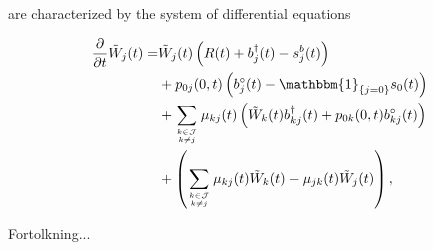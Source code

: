 \documentclass{book}
\newcommand{\1}[1]{\mathbbm{1}_{\left\lbrace #1 \right\rbrace}}
\theoremstyle{break}
\theoremstyle{remark}
\numberwithin{equation}{section}
\begin{document}
are characterized by the system of differential equations

\begin{align*}
    \frac{\partial}{\partial t} \tilde{W}_j(t) =& \tilde{W}_j(t) \left( R(t) + b_j^\dagger(t) - s_j^b(t) \right) \\
    &+ p_{0j}(0,t) \left( b_j^\circ(t) - \1{j=0} s_0(t) \right) \\
    &+ \sum_{k \in \mathcal{J} \atop k \neq j} \mu_{kj}(t) \left( \tilde{W}_k(t) b_{kj}^\dagger(t) + p_{0k}(0,t) b_{kj}^\circ(t) \right) \\
    &+ \left( \sum_{k \in \mathcal{J} \atop k \neq j} \mu_{kj}(t) \tilde{W}_k(t) - \mu_{jk}(t) \tilde{W}_j(t) \right),
\end{align*}

Fortolkning...
\end{document}
